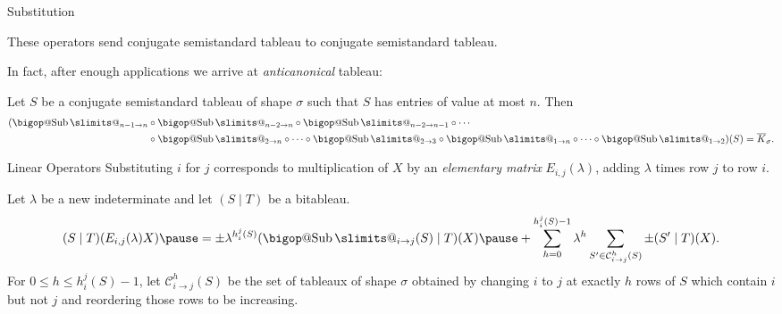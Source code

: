 \documentclass[aspectratio=169]{beamer}
\makeatletter
\DeclareRobustCommand\bigop[1]{%
  \mathop{\vphantom{\cdot}\mathpalette\bigop@{#1}}\slimits@
}
\newcommand{\bigop@}[2]{%
  \vcenter{%
    \sbox\z@{$#1\sum$}%
    \hbox{\resizebox{\ifx#1\displaystyle.9\fi\dimexpr\ht\z@+\dp\z@}{!}{$\m@th#2$}}%
  }%
}
\newcommand{\Sub}{\DOTSB\bigop{\mathrm{Sub}}}
\makeatother
\begin{document}
\begin{frame}{Substitution}

  \vspace{12pt}

  These operators send conjugate semistandard tableau to conjugate semistandard tableau.

  In fact, after enough applications we arrive at \emph{anticanonical} tableau:

  \pause

  \begin{lem}
    Let $S$ be a conjugate semistandard tableau of shape $\sigma$ such that $S$ has entries of value at most $n$.
    Then
    \begin{align*}
      (\Sub_{n - 1 \to n} &\circ \Sub_{n - 2 \to n} \circ \Sub_{n - 2 \to n-1} \circ \cdots \\
      &\circ \Sub_{2 \to n}\circ\cdots\circ\Sub_{2 \to 3} \circ \Sub_{1 \to n} \circ \cdots \circ \Sub_{1 \to 2})(S) = \overline{K}_\sigma.
    \end{align*}
  \end{lem}

\end{frame}

\begin{frame}{Linear Operators}
    Substituting $i$ for $j$ corresponds to multiplication of $X$ by an \emph{elementary matrix} $E_{i, j}(\lambda)$, adding $\lambda$ times row $j$ to row $i$.
    
    \pause
  
    \begin{lem}
        Let $\lambda$ be a new indeterminate and let $(S \mid T)$ be a bitableau.\ \pause
        \[
            (S \mid T)(E_{i, j}(\lambda)X) \pause = \pm \lambda^{h_{i}^{j}(S)} (\Sub_{i \to j}(S) \mid T)(X) \pause + \sum_{h = 0}^{h_{i}^{j}(S) - 1} \lambda^h \sum_{S' \in \mathcal{C}^{h}_{i \to j}(S)} \pm  (S' \mid T)(X).
        \]
        For $0 \leq h \leq h_{i}^{j}(S) - 1$, let $\mathcal{C}^{h}_{i \to j}(S)$ be the set of tableaux of shape $\sigma$ obtained by changing $i$ to $j$ at exactly $h$ rows of $S$ which contain $i$ but not $j$ and reordering those rows to be increasing.
    \end{lem}
\end{frame}
\end{document}
